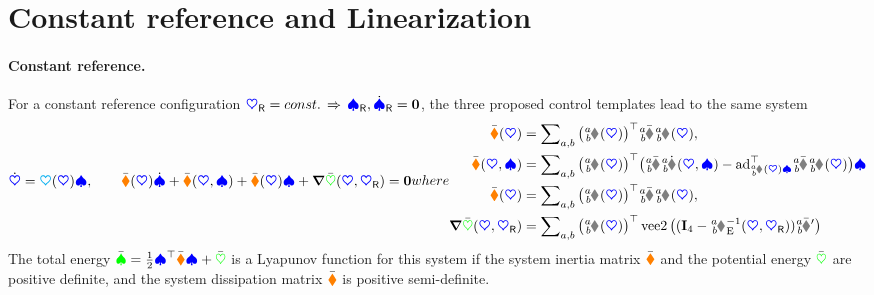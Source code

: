 \section{Constant reference and Linearization}\label{sec:CtrlLinearization}
\paragraph{Constant reference.}
For a constant reference configuration $\boldsymbol{\textcolor{blue}{\heartsuit}}_{\mathsf{R}} = const. \, \Rightarrow \, \boldsymbol{\textcolor{blue}{\spadesuit}}_{\mathsf{R}}, \dot{\boldsymbol{\textcolor{blue}{\spadesuit}}}_{\mathsf{R}} = \boldsymbol{0}$, the three proposed control templates lead to the same system
\begin{subequations}
\label{eq:ClosedLoopStab}
\begin{align}
 \sysCoordd = \kinMat(\sysCoord) \sysVel,
\qquad
 \sysInertiaMatC(\sysCoord) \sysVeld + \gyroForceC(\sysCoord, \sysVel) + \sysDissMatC(\sysCoord)\sysVel + \differential \potentialEnergyC(\sysCoord, \sysCoordR) = \tuple{0}
\end{align}
where
\begin{align}
 \sysInertiaMatC(\sysCoord) &= \sumBodiesAB \big(\bodyJac{\BidxI}{\BidxII}(\sysCoord)\big)^\top \bodyInertiaMatC{\BidxI}{\BidxII} \bodyJac{\BidxI}{\BidxII}(\sysCoord),
\\
 \gyroForceC(\sysCoord, \sysVel) &= \sumBodiesAB \big(\bodyJac{\BidxI}{\BidxII}(\sysCoord)\big)^\top \big(\bodyInertiaMatC{\BidxI}{\BidxII} \bodyJacd{\BidxI}{\BidxII}(\sysCoord, \sysVel) - \ad{\bodyJac{\BidxI}{\BidxII}(\sysCoord)\sysVel}^\top \bodyInertiaMatC{\BidxI}{\BidxII}\bodyJac{\BidxI}{\BidxII}(\sysCoord) \big) \sysVel
\\
 \sysDissMatC(\sysCoord) &= \sumBodiesAB \big(\bodyJac{\BidxI}{\BidxII}(\sysCoord)\big)^\top \bodyDissMatC{\BidxI}{\BidxII} \bodyJac{\BidxI}{\BidxII}(\sysCoord),
\\
 \differential \potentialEnergyC(\sysCoord, \sysCoordR) &= \sumBodiesAB \big(\bodyJac{\BidxI}{\BidxII}(\sysCoord)\big)^\top \veeTwoOp \big( (\idMat[4] - \bodyHomoCoordE{\BidxI}{\BidxII}^{-1}(\sysCoord,\sysCoordR)) \bodyStiffMatCp{\BidxI}{\BidxII} \big)
\end{align} 
\end{subequations}
The total energy $\bar{\textcolor{green}{\spadesuit}} = \tfrac{1}{2} \boldsymbol{\textcolor{blue}{\spadesuit}}^\top \bar{\boldsymbol{\textcolor{orange}{\blacklozenge}}} \boldsymbol{\textcolor{blue}{\spadesuit}} + \bar{\textcolor{green}{\heartsuit}}$ is a Lyapunov function for this system if the system inertia matrix $\bar{\boldsymbol{\textcolor{orange}{\blacklozenge}}}$ and the potential energy $\bar{\textcolor{green}{\heartsuit}}$ are positive definite, and the system dissipation matrix $\bar{\boldsymbol{\textcolor{orange}{\blacklozenge}}}$ is positive semi-definite. 


